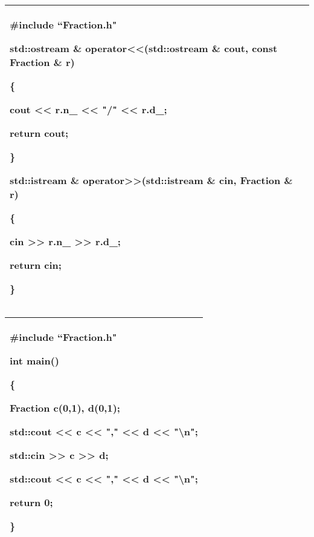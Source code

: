 \documentclass[
]{article}
\begin{document}
\begin{longtable}[]{@{}l@{}}
\toprule
\endhead
\begin{minipage}[t]{0.97\columnwidth}\raggedright
\#include ``Fraction.h"

std::ostream \& operator\textless\textless(std::ostream \& cout, const
Fraction \& r)

\{

cout \textless\textless{} r.n\_ \textless\textless{} "/"
\textless\textless{} r.d\_;

return cout;

\}

std::istream \& operator\textgreater\textgreater(std::istream \& cin,
Fraction \& r)

\{

cin \textgreater\textgreater{} r.n\_ \textgreater\textgreater{} r.d\_;

return cin;

\}\strut
\end{minipage}\tabularnewline
\bottomrule
\end{longtable}

\begin{longtable}[]{@{}l@{}}
\toprule
\endhead
\begin{minipage}[t]{0.97\columnwidth}\raggedright
\#include ``Fraction.h"

int main()

\{

Fraction c(0,1), d(0,1);

std::cout \textless\textless{} c \textless\textless{} ","
\textless\textless{} d \textless\textless{} "\textbackslash n";

std::cin \textgreater\textgreater{} c \textgreater\textgreater{} d;

std::cout \textless\textless{} c \textless\textless{} ","
\textless\textless{} d \textless\textless{} "\textbackslash n";

return 0;

\}\strut
\end{minipage}\tabularnewline
\bottomrule
\end{longtable}
\end{document}
